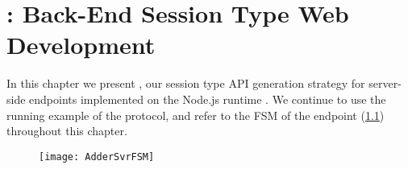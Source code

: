 \chapter{: Back-End Session Type Web Development}
\label{chap:node}

In this chapter we present ,
our session type API generation strategy for 
server-side endpoints implemented on the Node.js runtime \cite{node}.
We continue to use the running example of the 
protocol, and refer to the FSM of the  endpoint
(\cref{fig:addersvrfsm}) throughout this chapter.

\begin{figure}[!b]
\centering
\texttt{[image: AdderSvrFSM]}
\label{fig:addersvrfsm}
\end{figure}






